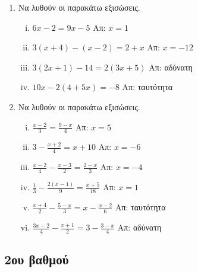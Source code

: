 \begin{enumerate}
  \item  Να λυθούν οι παρακάτω εξισώσεις.
    \begin{enumerate}[i)]
      \item $ 6x-2=9x-5 $ \hfill Απ: $ x=1 $
      \item $ 3(x+4)-(x-2) = 2+x $ \hfill Απ: $ x=-12 $ 
      \item $ 3(2x+1) - 14 = 2(3x+5) $ \hfill Απ: αδύνατη 
      \item $ 10x-2(4+5x) =-8 $ \hfill Απ: ταυτότητα 
    \end{enumerate}

  \item  Να λυθούν οι παρακάτω εξισώσεις.
    \begin{enumerate}[i)]
      \item $ \frac{x-2}{3} = \frac{9-x}{4} $ \hfill Απ: $ x=5 $ 
      \item $ 3 - \frac{x+2}{4} = x+10 $ \hfill Απ: $ x=-6 $ 
      \item $ \frac{x-2}{4} - \frac{x-3}{2} = \frac{2-x}{3} $ \hfill Απ: $ x=-4 $ 
      \item $ \frac{1}{3} - \frac{2(x-1)}{9} = \frac{x+5}{18} $ \hfill Απ: $ x=1 $ 
      \item $ \frac{x+4}{2} - \frac{5-x}{3} = x - \frac{x-2}{6} $ \hfill Απ: ταυτότητα
      \item $ \frac{3x-2}{4} - \frac{x+1}{2} = 3 - \frac{3-x}{4} $ \hfill Απ: αδύνατη 
    \end{enumerate}
\end{enumerate}

\subsection*{2ου βαθμού}

